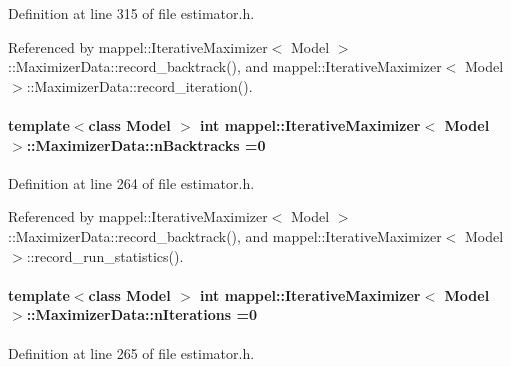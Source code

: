 Definition at line 315 of file estimator.\+h.



Referenced by mappel\+::\+Iterative\+Maximizer$<$ Model $>$\+::\+Maximizer\+Data\+::record\+\_\+backtrack(), and mappel\+::\+Iterative\+Maximizer$<$ Model $>$\+::\+Maximizer\+Data\+::record\+\_\+iteration().

\paragraph[{\texorpdfstring{n\+Backtracks}{nBacktracks}}]{\setlength{\rightskip}{0pt plus 5cm}template$<$class Model $>$ int {\bf mappel\+::\+Iterative\+Maximizer}$<$ Model $>$\+::Maximizer\+Data\+::n\+Backtracks =0}\hypertarget{classmappel_1_1IterativeMaximizer_1_1MaximizerData_a7caa78309de84e0ab4815fc00fbd6cf5}{}\label{classmappel_1_1IterativeMaximizer_1_1MaximizerData_a7caa78309de84e0ab4815fc00fbd6cf5}


Definition at line 264 of file estimator.\+h.



Referenced by mappel\+::\+Iterative\+Maximizer$<$ Model $>$\+::\+Maximizer\+Data\+::record\+\_\+backtrack(), and mappel\+::\+Iterative\+Maximizer$<$ Model $>$\+::record\+\_\+run\+\_\+statistics().

\paragraph[{\texorpdfstring{n\+Iterations}{nIterations}}]{\setlength{\rightskip}{0pt plus 5cm}template$<$class Model $>$ int {\bf mappel\+::\+Iterative\+Maximizer}$<$ Model $>$\+::Maximizer\+Data\+::n\+Iterations =0}\hypertarget{classmappel_1_1IterativeMaximizer_1_1MaximizerData_a7ee453c4ba6108b9c0cbce345b0ee4da}{}\label{classmappel_1_1IterativeMaximizer_1_1MaximizerData_a7ee453c4ba6108b9c0cbce345b0ee4da}


Definition at line 265 of file estimator.\+h.



